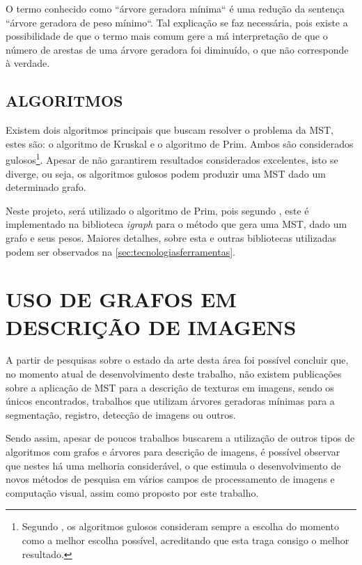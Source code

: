 \par O termo conhecido como ``árvore geradora mínima`` é uma redução da sentença ``árvore geradora de peso mínimo``. Tal explicação se faz necessária, pois existe a possibilidade de que o termo mais comum gere a má interpretação de que o número de arestas de uma árvore geradora foi diminuído, o que não corresponde à verdade.

\subsection{ALGORITMOS}
\label{subsec:algoritmosmst}

\par Existem dois algoritmos principais que buscam resolver o problema da MST, estes são: o algoritmo de Kruskal e o algoritmo de Prim. Ambos são considerados gulosos\footnote{Segundo , os algoritmos gulosos consideram sempre a escolha do momento como a melhor escolha possível, acreditando que esta traga consigo o melhor resultado.}. Apesar de não garantirem resultados considerados excelentes, isto se diverge, ou seja, os algoritmos gulosos podem produzir uma MST dado um determinado grafo.
\par Neste projeto, será utilizado o algoritmo de Prim, pois segundo , este é implementado na biblioteca \textit{igraph} para o método que gera uma MST, dado um grafo e seus pesos. Maiores detalhes, sobre esta e outras bibliotecas utilizadas podem ser observados na \autoref{sec:tecnologiasferramentas}.

\section{USO DE GRAFOS EM DESCRIÇÃO DE IMAGENS}
\label{sec:usografosdescimg}

\par A partir de pesquisas sobre o estado da arte desta área foi possível concluir que, no momento atual de desenvolvimento deste trabalho, não existem publicações sobre a aplicação de MST para a descrição de texturas em imagens, sendo os únicos encontrados, trabalhos que utilizam árvores geradoras mínimas para a segmentação, registro, detecção de imagens ou outros.

\par Sendo assim, apesar de poucos trabalhos buscarem a utilização de outros tipos de algoritmos com grafos e árvores para descrição de imagens, é possível observar que nestes há uma melhoria considerável, o que estimula o desenvolvimento de novos métodos de pesquisa em vários campos de processamento de imagens e computação visual, assim como proposto por este trabalho.

